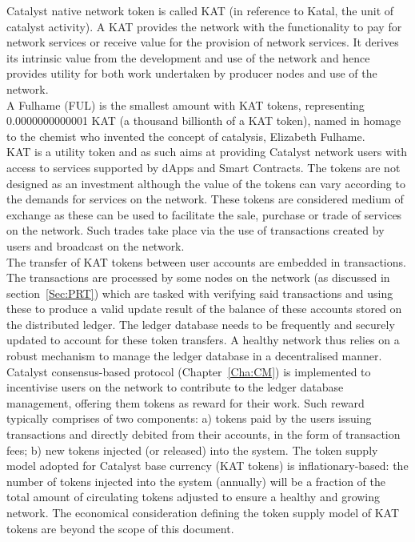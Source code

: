 Catalyst native network token is called KAT (in reference to Katal, the unit of catalyst activity). A KAT provides the network with the functionality to pay for network services or receive value for the provision of network services. It derives its intrinsic value from the development and use of the network and hence provides utility for both work undertaken by producer nodes and use of the network. \\

A Fulhame (FUL) is the smallest amount with KAT tokens, representing 0.0000000000001 KAT (a thousand billionth of a KAT token), named in homage to the chemist who invented the concept of catalysis, Elizabeth Fulhame.\\

KAT is a utility token and as such aims at providing Catalyst network users with access to services supported by dApps and Smart Contracts. The tokens are not designed as an investment although the value of the tokens can vary according to the demands for services on the network. These tokens are considered medium of exchange as these can be used to facilitate the sale, purchase or trade of services on the network. Such trades take place via the use of transactions created by users and broadcast on the network. \\

The transfer of KAT tokens between user accounts are embedded in transactions. The transactions are processed by some nodes on the network (as discussed in section~\ref{Sec:PRT}) which are tasked with verifying said transactions and using these to produce a valid update result of the balance of these accounts stored on the distributed ledger. The ledger database needs to be frequently and securely updated to account for these token transfers. A healthy network thus relies on a robust mechanism to manage the ledger database in a decentralised manner. Catalyst consensus-based protocol (Chapter~\ref{Cha:CM}) is implemented to incentivise users on the network to contribute to the ledger database management, offering them tokens as reward for their work. Such reward typically comprises of two components: a) tokens paid by the users issuing transactions and directly debited from their accounts, in the form of transaction fees; b) new tokens injected (or released) into the system. The token supply model adopted for Catalyst base currency (KAT tokens) is inflationary-based: the number of tokens injected into the system (annually) will be a fraction of the total amount of circulating tokens adjusted to ensure a healthy and growing network. The economical consideration defining the token supply model of KAT tokens are beyond the scope of this document. 
